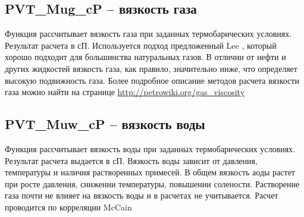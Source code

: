 \documentclass[]{scrreprt}
\begin{document}
\subsection{PVT\_Mug\_cP – вязкость газа}

Функция рассчитывает вязкость газа при заданных термобарических условиях. Результат расчета в сП.  Используется подход предложенный Lee  \cite{Lee_1966}, который хорошо подходит для большинства натуральных газов. 
В отличии от нефти и других жидкостей вязкость газа, как правило, значительно ниже, что определяет высокую подвижность газа. 
Более подробное описание методов расчета вязкости газа можно найти на странице  \href{http://petrowiki.org/Gas_viscosity}{http://petrowiki.org/gas\_viscosity}



\newcommand{\MugDataFile}{data/Mug_P_data.txt}

\subsection{PVT\_Muw\_cP – вязкость воды}

Функция рассчитывает вязкость воды при заданных термобарических условиях. Результат расчета выдается в сП. 
Вязкость воды зависит от давления, температуры и наличия растворенных примесей. В общем вязкость аоды растет при росте давления, снижении температуры, повышении солености. 
Растворение газа почти не влияет на вязкость воды и в расчетах не учитывается. 
Расчет проводится по корреляции McCain \cite{McCain_1991}
\end{document}
